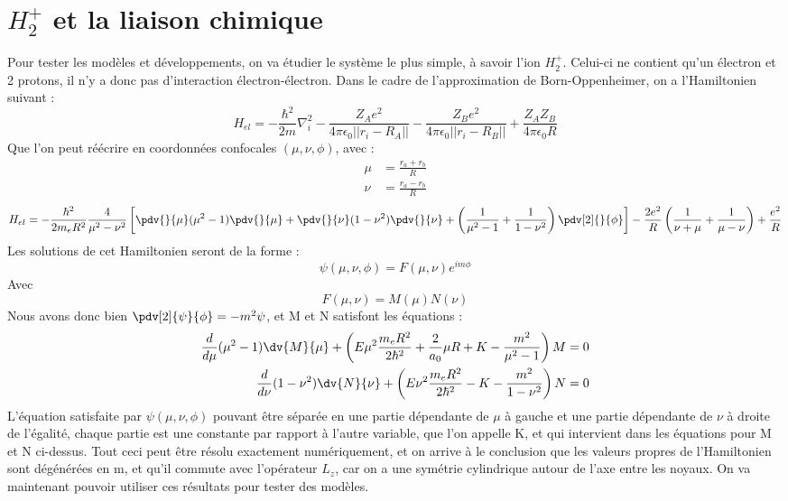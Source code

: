 \section{$H_2^+$ et la liaison chimique}

Pour tester les modèles et développements, on va étudier le système le plus simple, à savoir l'ion $H_2^+$. Celui-ci ne contient qu'un électron et 2 protons, il n'y a donc pas d'interaction électron-électron. Dans le cadre de l'approximation de Born-Oppenheimer, on a l'Hamiltonien suivant : 
\begin{equation*}
    H_{el} = -\frac{\hbar^2}{2m}\nabla^2_i-\frac{Z_Ae^2}{4\pi \epsilon_0||r_i - R_A||}-\frac{Z_Be^2}{4\pi \epsilon_0||r_i - R_B||} +\frac{Z_AZ_B}{4\pi\epsilon_0R}
\end{equation*}
Que l'on peut réécrire en coordonnées confocales $(\mu, \nu, \phi)$, avec :
\begin{equation*}
    \begin{split}
        \mu &= \frac{r_a + r_b}{R}\\
        \nu &= \frac{r_a-r_b}{R}
    \end{split}
\end{equation*}
\begin{equation*}
    H_{el} = -\frac{\hbar^2}{2m_eR^2}\frac{4}{\mu^2-\nu^2}\left[\pdv{}{\mu}(\mu^2-1)\pdv{}{\mu}+\pdv{}{\nu}(1-\nu^2)\pdv{}{\nu}+\left(\frac{1}{\mu^2-1}+\frac{1}{1-\nu^2}\right)\pdv[2]{}{\phi}\right] - \frac{2e^2}{R}\left(\frac{1}{\nu + \mu}+\frac{1}{\mu-\nu}\right) + \frac{e^2}{R} 
\end{equation*}
Les solutions de cet Hamiltonien seront de la forme : 
\begin{equation*}
    \psi(\mu,\nu,\phi) = F(\mu,\nu)e^{im\phi}
\end{equation*}
Avec
\begin{equation*}
    F(\mu,\nu) = M(\mu)N(\nu)
\end{equation*}
Nous avons donc bien $\pdv[2]{\psi}{\phi} = -m^2\psi$, et M et N satisfont les équations : 
\begin{equation*}
    \begin{split}
        \frac{d}{d\mu}(\mu^2-1)\dv{M}{\mu} + \left(E\mu^2\frac{m_eR^2}{2\hbar^2}+\frac{2}{a_0}\mu R+K-\frac{m^2}{\mu^2-1}\right)M &= 0\\
        \frac{d}{d\nu}(1-\nu^2)\dv{N}{\nu} + \left(E\nu^2\frac{m_eR^2}{2\hbar^2}-K-\frac{m^2}{1-\nu^2}\right)N &= 0
    \end{split}
\end{equation*}
L'équation satisfaite par $\psi(\mu,\nu,\phi)$ pouvant être séparée en une partie dépendante de $\mu$ à gauche et une partie dépendante de $\nu$ à droite de l'égalité, chaque partie est une constante par rapport à l'autre variable, que l'on appelle K, et qui intervient dans les équations pour M et N ci-dessus.\newline
Tout ceci peut être résolu exactement numériquement, et on arrive à le conclusion que les valeurs propres de l'Hamiltonien sont dégénérées en m, et qu'il commute avec l'opérateur $L_z$, car on a une symétrie cylindrique autour de l'axe entre les noyaux. \newline
On va maintenant pouvoir utiliser ces résultats pour tester des modèles.

